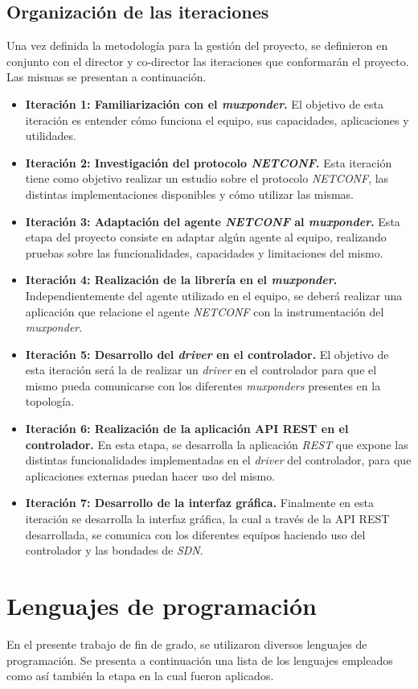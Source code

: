\subsection{Organización de las iteraciones}
Una vez definida la metodología para la gestión del proyecto, se definieron en conjunto con el director y co-director las iteraciones que conformarán el proyecto. Las mismas se presentan a continuación.
\begin{itemize}
	\item \textbf{Iteración 1: Familiarización con el \textit{muxponder}.} El objetivo de esta iteración es entender cómo funciona el equipo, sus capacidades, aplicaciones y utilidades.
	\item \textbf{Iteración 2: Investigación del protocolo \textit{NETCONF}.} Esta iteración tiene como objetivo realizar un estudio sobre el protocolo \textit{NETCONF}, las distintas implementaciones disponibles y cómo utilizar las mismas.
	\item \textbf{Iteración 3: Adaptación del agente \textit{NETCONF} al \textit{muxponder}.} Esta etapa del proyecto consiste en adaptar algún agente al equipo, realizando pruebas sobre las funcionalidades, capacidades y limitaciones del mismo.
	\item \textbf{Iteración 4: Realización de la librería en el \textit{muxponder}.} Independientemente del agente utilizado en el equipo, se deberá realizar una aplicación que relacione el agente \textit{NETCONF} con la instrumentación del \textit{muxponder}.
	\item \textbf{Iteración 5: Desarrollo del \textit{driver} en el controlador.} El objetivo de esta iteración será la de realizar un \textit{driver} en el controlador para que el mismo pueda comunicarse con los diferentes \textit{muxponders} presentes en la topología.
	\item \textbf{Iteración 6: Realización de la aplicación API REST en el controlador.} En esta etapa, se desarrolla la aplicación \textit{REST} que expone las distintas funcionalidades implementadas en el \textit{driver} del controlador, para que aplicaciones externas puedan hacer uso del mismo.
	\item \textbf{Iteración 7: Desarrollo de la interfaz gráfica.} Finalmente en esta iteración se desarrolla la interfaz gráfica, la cual a través de la API REST desarrollada, se comunica con los diferentes equipos haciendo uso del controlador y las bondades de \textit{SDN}.
\end{itemize}

\section{Lenguajes de programación}
En el presente trabajo de fin de grado, se utilizaron diversos lenguajes de programación. Se presenta a continuación una lista de los lenguajes empleados como así también la etapa en la cual fueron aplicados. 


